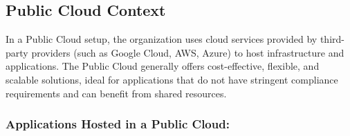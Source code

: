 \subsection{Public Cloud Context}

In a Public Cloud setup, the organization uses cloud services provided by third-party providers (such as Google Cloud, AWS, Azure) to host infrastructure and applications. The Public Cloud generally offers cost-effective, flexible, and scalable solutions, ideal for applications that do not have stringent compliance requirements and can benefit from shared resources.

\subsubsection{Applications Hosted in a Public Cloud:}

